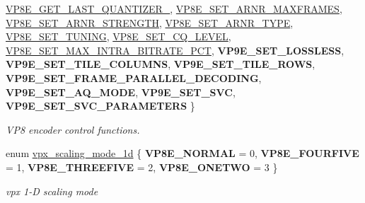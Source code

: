 \begin{DoxyCompactItemize}
\hyperlink{group__vp8__encoder_gga6deae3d561c838952552c3d3756322ecad2cfc9712d2eab30b5a59a60d0daaade}{\-V\-P8\-E\-\_\-\-G\-E\-T\-\_\-\-L\-A\-S\-T\-\_\-\-Q\-U\-A\-N\-T\-I\-Z\-E\-R\-\_}, 
\hyperlink{group__vp8__encoder_gga6deae3d561c838952552c3d3756322eca628d73f1a69fadd8aa57e0dfef578da8}{\-V\-P8\-E\-\_\-\-S\-E\-T\-\_\-\-A\-R\-N\-R\-\_\-\-M\-A\-X\-F\-R\-A\-M\-E\-S}, 
\hyperlink{group__vp8__encoder_gga6deae3d561c838952552c3d3756322eca0a8c40a768af935ae73faa53355c3244}{\-V\-P8\-E\-\_\-\-S\-E\-T\-\_\-\-A\-R\-N\-R\-\_\-\-S\-T\-R\-E\-N\-G\-T\-H}, 
\*
\hyperlink{group__vp8__encoder_gga6deae3d561c838952552c3d3756322eca4e0a0af58670012026c213083cd48f3a}{\-V\-P8\-E\-\_\-\-S\-E\-T\-\_\-\-A\-R\-N\-R\-\_\-\-T\-Y\-P\-E}, 
\hyperlink{group__vp8__encoder_gga6deae3d561c838952552c3d3756322eca126ccbe7bde63b59cec5ea68a82dd498}{\-V\-P8\-E\-\_\-\-S\-E\-T\-\_\-\-T\-U\-N\-I\-N\-G}, 
\hyperlink{group__vp8__encoder_gga6deae3d561c838952552c3d3756322ecacd4f5b730bddb9788c3d0b82218ec503}{\-V\-P8\-E\-\_\-\-S\-E\-T\-\_\-\-C\-Q\-\_\-\-L\-E\-V\-E\-L}, 
\hyperlink{group__vp8__encoder_gga6deae3d561c838952552c3d3756322eca09c69ff4a3aabdb307d4f24027dfc4c1}{\-V\-P8\-E\-\_\-\-S\-E\-T\-\_\-\-M\-A\-X\-\_\-\-I\-N\-T\-R\-A\-\_\-\-B\-I\-T\-R\-A\-T\-E\-\_\-\-P\-C\-T}, 
\*
{\bfseries \-V\-P9\-E\-\_\-\-S\-E\-T\-\_\-\-L\-O\-S\-S\-L\-E\-S\-S}, 
{\bfseries \-V\-P9\-E\-\_\-\-S\-E\-T\-\_\-\-T\-I\-L\-E\-\_\-\-C\-O\-L\-U\-M\-N\-S}, 
{\bfseries \-V\-P9\-E\-\_\-\-S\-E\-T\-\_\-\-T\-I\-L\-E\-\_\-\-R\-O\-W\-S}, 
{\bfseries \-V\-P9\-E\-\_\-\-S\-E\-T\-\_\-\-F\-R\-A\-M\-E\-\_\-\-P\-A\-R\-A\-L\-L\-E\-L\-\_\-\-D\-E\-C\-O\-D\-I\-N\-G}, 
\*
{\bfseries \-V\-P9\-E\-\_\-\-S\-E\-T\-\_\-\-A\-Q\-\_\-\-M\-O\-D\-E}, 
{\bfseries \-V\-P9\-E\-\_\-\-S\-E\-T\-\_\-\-S\-V\-C}, 
{\bfseries \-V\-P9\-E\-\_\-\-S\-E\-T\-\_\-\-S\-V\-C\-\_\-\-P\-A\-R\-A\-M\-E\-T\-E\-R\-S}
 \}
\begin{DoxyCompactList}\small\item\em \-V\-P8 encoder control functions. \end{DoxyCompactList}\item 
enum \hyperlink{group__vp8__encoder_ga70071b1bb6cac9a1ef0ea3d8362ff94f}{vpx\-\_\-scaling\-\_\-mode\-\_\-1d} \{ {\bfseries \-V\-P8\-E\-\_\-\-N\-O\-R\-M\-A\-L} =  0, 
{\bfseries \-V\-P8\-E\-\_\-\-F\-O\-U\-R\-F\-I\-V\-E} =  1, 
{\bfseries \-V\-P8\-E\-\_\-\-T\-H\-R\-E\-E\-F\-I\-V\-E} =  2, 
{\bfseries \-V\-P8\-E\-\_\-\-O\-N\-E\-T\-W\-O} =  3
 \}
\begin{DoxyCompactList}\small\item\em vpx 1-\/\-D scaling mode \end{DoxyCompactList}\item 

\end{DoxyCompactItemize}

